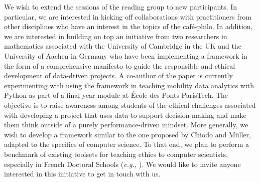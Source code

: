 \documentclass[journal]{IEEEtran}
\begin{document}
We wish to extend the sessions of the reading group to new participants. In
particular, we are interested in kicking off collaborations with practitioners
from other disciplines who have an interest in the topics of the café-philo.
In addition, we are interested in building on top an initiative from two
researchers in mathematics associated with the University of Cambridge in the
UK and the University of Aachen in Germany who have been implementing a
framework in the form of a comprehensive manifesto \cite{Chiodo23} to guide
the responsible and ethical development of data-driven projects. A co-author
of the paper is currently experimenting with using the framework in teaching
mobility data analytics with Python as part of a final year module at École
des Ponts ParisTech. The objective is to raise awareness among students of the
ethical challenges associated with developing a project that uses data to
support decision-making and make them think outside of a purely
performance-driven mindset. More generally, we wish to develop a framework
similar to the one proposed by Chiodo and Müller, adapted to the specifics
of computer science. To that end, we plan to perform a benchmark of existing
toolsets for teaching ethics to computer scientists, especially in French
Doctoral Schools (\textit{e.g.,} \cite{MoocEthics}). We would like to invite
anyone interested in this initiative to get in touch with us.


 
\end{document}
